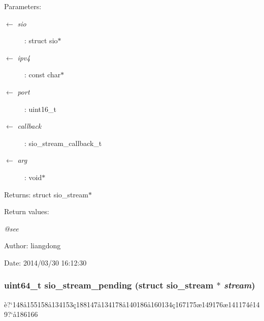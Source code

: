 \begin{Desc}
\item[Parameters:]
\begin{description}
\item[\mbox{$\leftarrow$} {\em sio}]: struct sio$\ast$ \item[\mbox{$\leftarrow$} {\em ipv4}]: const char$\ast$ \item[\mbox{$\leftarrow$} {\em port}]: uint16\_\-t \item[\mbox{$\leftarrow$} {\em callback}]: sio\_\-stream\_\-callback\_\-t \item[\mbox{$\leftarrow$} {\em arg}]: void$\ast$ \end{description}
\end{Desc}
\begin{Desc}
\item[Returns:]struct sio\_\-stream$\ast$ \end{Desc}
\begin{Desc}
\item[Return values:]
\begin{description}
\item[{\em @see}]\end{description}
\end{Desc}
\begin{Desc}
\item[Author:]liangdong \end{Desc}
\begin{Desc}
\item[Date:]2014/03/30 16:12:30 \end{Desc}
\subsubsection{\setlength{\rightskip}{0pt plus 5cm}uint64\_\-t sio\_\-stream\_\-pending (struct sio\_\-stream $\ast$ {\em stream})}\label{sio__stream_8h_a16}


\`{e}?`148\aa{}155158\aa{}134153\c{c}188147\aa{}134178\aa{}140186\aa{}160134\c{c}167175\ae{}149176\ae{}141174\'{e}149?`\aa{}186166 

